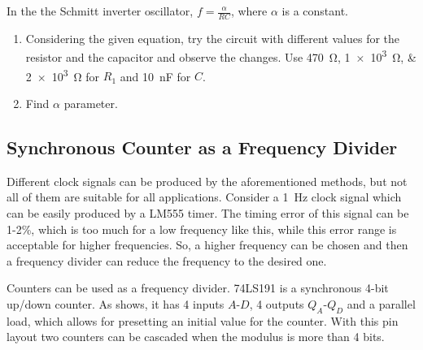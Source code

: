 \documentclass[12pt, logo=tehranDLDL/ut]{tehranDLDL}
\begin{document}
In the the Schmitt inverter oscillator, $f = \frac{\alpha}{RC}$, where $\alpha$ is a constant.

\begin{enumerate}
    \item Considering the given equation, try the circuit with different values for the resistor and the capacitor and observe the changes. Use \SIlist{470; 1e3; 2e3}{\ohm} for $R_1$ and \SI{10}{\nano\farad} for $C$.
    \item Find $\alpha$ parameter.
\end{enumerate}

\designverification{}

\subsection{Synchronous Counter as a Frequency Divider\label{sec:counter}}

Different clock signals can be produced by the aforementioned methods, but not all of them are suitable for all applications. Consider a \SI{1}{\hertz} clock signal which can be easily produced by a LM555 timer. The timing error of this signal can be 1-2\%, which is too much for a low frequency like this, while this error range is acceptable for higher frequencies. So, a higher frequency can be chosen and then a frequency divider can reduce the frequency to the desired one.

Counters can be used as a frequency divider. 74LS191 is a synchronous 4-bit up/down counter. As  shows, it has 4 inputs $A$-$D$, 4 outputs $Q_A$-$Q_D$ and a parallel load, which allows for presetting an initial value for the counter. With this pin layout two counters can be cascaded when the modulus is more than 4 bits.
\end{document}
